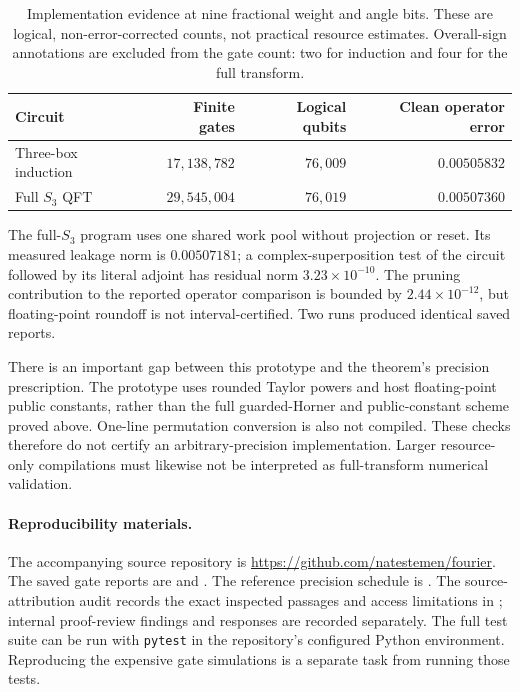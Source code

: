 \documentclass[11pt]{article}
\theoremstyle{definition}
\begin{document}
\begin{table}[htbp]
\centering\small
\begin{tabularx}{\textwidth}{@{}Xrrr@{}}
\toprule
Circuit & Finite gates & Logical qubits & Clean operator error\\
\midrule
Three-box induction & $17{,}138{,}782$ & $76{,}009$ & $0.00505832$\\
Full $S_3$ QFT & $29{,}545{,}004$ & $76{,}019$ & $0.00507360$\\
\bottomrule
\end{tabularx}
\caption{Implementation evidence at nine fractional weight and angle bits.
These are logical, non-error-corrected counts, not practical resource
estimates. Overall-sign annotations are excluded from the gate count:
two for induction and four for the full transform.}\label{tab:validation}
\end{table}

The full-$S_3$ program uses one shared work pool without projection or
reset. Its measured leakage norm is $0.00507181$; a complex-superposition
test of the circuit followed by its literal adjoint has residual norm
$3.23\times10^{-10}$. The pruning contribution to the reported operator
comparison is bounded by $2.44\times10^{-12}$, but floating-point roundoff
is not interval-certified. Two runs produced identical saved reports.

There is an important gap between this prototype and the theorem's
precision prescription. The prototype uses rounded Taylor powers and
host floating-point public constants, rather than the full guarded-Horner
and public-constant scheme proved above. One-line permutation conversion
is also not compiled. These checks therefore do not certify an
arbitrary-precision implementation. Larger resource-only compilations
must likewise not be interpreted as full-transform numerical validation.

\paragraph{Reproducibility materials.}
The accompanying source repository is
\url{https://github.com/natestemen/fourier}.
The saved gate reports are
 and
.
The reference precision schedule is
.
The source-attribution audit records the exact inspected passages and
access limitations in ; internal
proof-review findings and responses are recorded separately.
The full test suite can be run with \texttt{pytest} in the repository's
configured Python environment. Reproducing the expensive gate simulations
is a separate task from running those tests.
\end{document}

